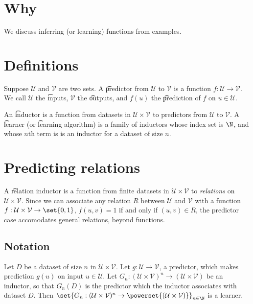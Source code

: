

\section*{Why}

We discuss inferring (or learning) functions from examples.

\section*{Definitions}

Suppose $\mathcal{U} $ and $\mathcal{V} $ are two sets.
A \t{predictor} from $\mathcal{U} $ to $\mathcal{V} $ is a function $f: \mathcal{U}  \to \mathcal{V} $.
We call $\mathcal{U} $ the \t{inputs}, $\mathcal{V} $ the \t{outputs}, and $f(u)$ the \t{prediction} of $f$ on $u \in \mathcal{U} $.

An \t{inductor} is a function from datasets in $\mathcal{U} \times  \mathcal{V} $ to predictors from $\mathcal{U} $ to $\mathcal{V} $.
A \t{learner} (or \t{learning algorithm}) is a family of inductors whose index set is $\N  $, and whose $n$th term is is an inductor for a dataset of size $n$.

\section*{Predicting relations}

A \t{relation inductor} is a function from finite datasets in $\mathcal{U}  \times  \mathcal{V} $ to \textit{relations} on $\mathcal{U}  \times  \mathcal{V} $.
Since we can associate any relation $R$ between $\mathcal{U} $ and $\mathcal{V} $ with a function $f: \mathcal{U}  \times \mathcal{V}  \to \set{0, 1}$, $f(u, v) = 1$ if and only if $(u, v) \in R$, the predictor case accomodates general relations, beyond functions.

\subsection*{Notation}

Let $D$ be a dataset of size $n$ in $\mathcal{U}  \times \mathcal{V} $.
Let $g: \mathcal{U}  \to \mathcal{V} $, a predictor, which makes prediction $g(u)$ on input $u \in \mathcal{U} $.
Let $G_n: (\mathcal{U}  \times  \mathcal{V} )^n \to (\mathcal{U} \times  \mathcal{V} )$ be an inductor, so that $G_n(D)$ is the predictor which the inductor associates with dataset $D$.
Then $\set{G_n: (\mathcal{U}  \times  \mathcal{V} )^n \to \powerset{(\mathcal{U}  \times  \mathcal{V} )}}_{n \in \N  }$ is a learner.

